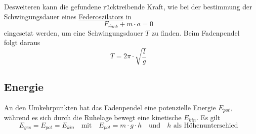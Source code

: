 \documentclass{article}
\begin{document}
Desweiteren kann die gefundene rücktreibende Kraft, wie bei der bestimmung der Schwingungsdauer eines \hyperref[Federoszilatoren]{Federoszilators} in
\[
 F_{r\ddot{u}ck} + m \cdot a = 0
\] 
eingesetzt werden, um eine Schwingungsdauer $T$ zu finden. Beim Fadenpendel folgt daraus
\[
 \boxed{
  T = 2\pi \cdot \sqrt{\frac{l}{g}}
 } 
\] 
 
\subsection{Energie}
An den Umkehrpunkten hat das Fadenpendel eine potenzielle Energie $E_{pot}$, während es sich durch die Ruhelage bewegt eine kinetische $E_{kin}$. Es gilt
\[
 E_{ges} = E_{pot} = E_{kin}
 \quad \text{mit} \quad 
 E_{pot} = m \cdot g \cdot h
 \quad \text{und} \quad
 \text{$h$ als Höhenunterschied} 
\] 
 
\end{document}
